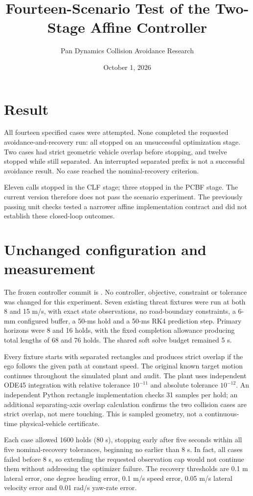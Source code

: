\documentclass[11pt]{article}
\title{Fourteen-Scenario Test of the Two-Stage Affine Controller}
\author{Pan Dynamics Collision Avoidance Research}
\date{October 1, 2026}
\begin{document}
\maketitle

\section{Result}
All fourteen specified cases were attempted. None completed the requested
avoidance-and-recovery run: all stopped on an unsuccessful optimization stage.
Two cases had strict geometric vehicle overlap before stopping, and twelve
stopped while still separated. An interrupted separated prefix is not a
successful avoidance result. No case reached the nominal-recovery criterion.

Eleven calls stopped in the CLF stage; three stopped in the PCBF stage.
The current version therefore does not pass the scenario experiment. The
previously passing unit checks tested a narrower affine implementation
contract and did not establish these closed-loop outcomes.

\section{Unchanged configuration and measurement}
The frozen controller commit is
. No controller, objective,
constraint or tolerance was changed for this experiment. Seven existing
threat fixtures were run at both 8 and 15 m/s, with exact state observations,
no road-boundary constraints, a 6-mm configured buffer, a 50-ms hold and a
50-ms RK4 prediction step. Primary horizons were 8 and 16 holds, with the
fixed completion allowance producing total lengths of 68 and 76 holds.
The shared soft solve budget remained 5 s.

Every fixture starts with separated rectangles and produces strict overlap
if the ego follows the given path at constant speed. The original known target
motion continues throughout the simulated plant and audit. The plant uses
independent ODE45 integration with relative tolerance $10^{-11}$ and absolute
tolerance $10^{-12}$. An independent Python rectangle implementation checks
31 samples per hold; an additional separating-axis overlap calculation
confirms the two collision cases are strict overlap, not mere touching.
This is sampled geometry, not a continuous-time physical-vehicle certificate.

Each case allowed 1600 holds (80 s), stopping early after five seconds within
all five nominal-recovery tolerances, beginning no earlier than 8 s. In fact,
all cases failed before 8 s, so extending the requested observation cap would
not continue them without addressing the optimizer failure. The recovery
thresholds are 0.1 m lateral error, one degree heading error, 0.1 m/s speed
error, 0.05 m/s lateral velocity error and 0.01 rad/s yaw-rate error.
\end{document}
